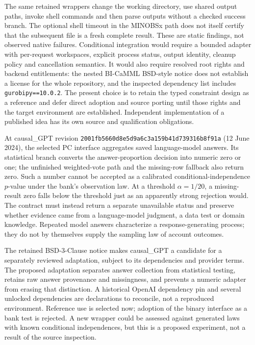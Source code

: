 The same retained wrappers change the working directory, use shared output
paths, invoke shell commands and then parse outputs without a checked success
branch. The optional shell timeout in the MINOBSx path does not itself certify
that the subsequent file is a fresh complete result. These are static findings,
not observed native failures. Conditional integration would require a bounded
adapter with per-request workspaces, explicit process status, output identity,
cleanup policy and cancellation semantics. It would also require resolved root
rights and backend entitlements: the nested BI-CaMML BSD-style notice does not
establish a license for the whole repository, and the inspected dependency list
includes \texttt{gurobipy==10.0.2}. The present choice is to retain the typed
constraint design as a reference and defer direct adoption and source porting
until those rights and the target environment are established. Independent
implementation of a published idea has its own source and qualification
obligations.~\citep{exec14_iid_cd,exec25_agents_choice}

At causal\_GPT revision
\texttt{2001fb5660d8e5d9a6c3}\allowbreak\texttt{a159b41d739316b8f91a}
(12 June 2024), the selected PC interface aggregates saved language-model
answers. Its statistical branch converts the answer-proportion decision into
numeric zero or one; the unfinished weighted-vote path and the missing-row
fallback also return zero. Such a number cannot be accepted as a calibrated
conditional-independence $p$-value under the bank's observation law. At a
threshold $\alpha=1/20$, a missing-result zero falls below the threshold just as
an apparently strong rejection would. The contract must instead return a
separate unavailable status and preserve whether evidence came from a
language-model judgment, a data test or domain knowledge. Repeated model
answers characterize a response-generating process; they do not by themselves
supply the sampling law of account outcomes.~\citep{exec14_iid_gpt,exec25_agents_choice}

The retained BSD-3-Clause notice makes causal\_GPT a candidate for a separately
reviewed adaptation, subject to its dependencies and provider terms. The
proposed adaptation separates answer collection from statistical testing,
retains raw answer provenance and missingness, and prevents a numeric adapter
from erasing that distinction. A historical OpenAI dependency pin and several
unlocked dependencies are declarations to reconcile, not a reproduced
environment. Reference use is selected now; adoption of the binary interface
as a bank test is rejected. A new wrapper could be assessed against generated
laws with known conditional independences, but this is a proposed experiment,
not a result of the source inspection.~\citep{exec14_iid_gpt,exec25_agents_choice}

